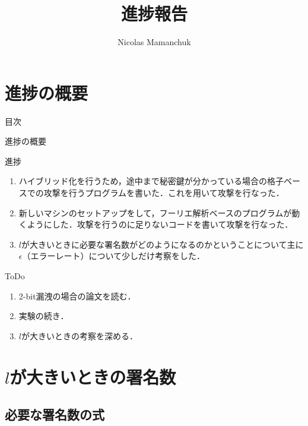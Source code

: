 \documentclass[dvipdfm]{beamer}
\title[進捗報告\todayAD]{進捗報告\todayAD}
\author[Nicolas Mamanchuk]{Nicolas Mamanchuk}
\institute[筑波大学 情報理工学位P 1年]{筑波大学 情報理工学位P 1年}
\date[April 6 2022]{\todayADJP}
\theoremstyle{example}
\begin{document}
\begin{frame}
    \titlepage %
\end{frame}


\section{進捗の概要}

\begin{frame}{目次}
    \tableofcontents[currentsection]
\end{frame}

\begin{frame}{進捗の概要}
    \begin{block}{進捗}
        \begin{enumerate}[1]
            \item ハイブリッド化を行うため，途中まで秘密鍵が分かっている場合の格子ベースでの攻撃を行うプログラムを書いた．これを用いて攻撃を行なった．
            \item 新しいマシンのセットアップをして，フーリエ解析ベースのプログラムが動くようにした．攻撃を行うのに足りないコードを書いて攻撃を行なった．
            \item $l$が大きいときに必要な署名数がどのようになるのかということについて主に$\epsilon$（エラーレート）について少しだけ考察をした．
        \end{enumerate}
    \end{block}
    \begin{block}{ToDo}
        \begin{enumerate}[1]
            \item 2-bit漏洩の場合の論文を読む．
            \item 実験の続き．
            \item $l$が大きいときの考察を深める．
        \end{enumerate}
    \end{block}
\end{frame}

\section{$l$が大きいときの署名数}
\subsection{必要な署名数の式}
\end{document}
